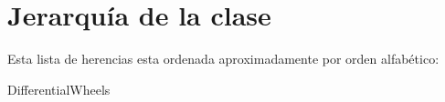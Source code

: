 \section{Jerarquía de la clase}
Esta lista de herencias esta ordenada aproximadamente por orden alfabético\+:\begin{DoxyCompactList}
\item Differential\+Wheels\begin{DoxyCompactList}
\item {}
\end{DoxyCompactList}
\end{DoxyCompactList}
